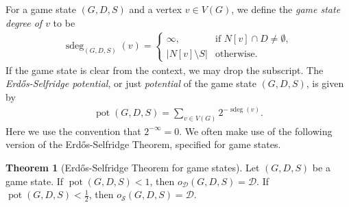 \documentclass[a4paper,11pt,oneside]{scrartcl}
\theoremstyle{definition}
\newtheorem{theorem}[definition]{Theorem}
\theoremstyle{remark}
\DeclareMathOperator{\pot}{pot}
\DeclareMathOperator{\gsdeg}{sdeg}
\begin{document}
For a game state $(G,D,S)$ and a vertex $v \in V(G)$, we define the \emph{game state degree of $v$} to be
\begin{align*}
    \gsdeg_{(G,D,S)}(v) = \begin{cases}
        \infty, &\text{if } N[v] \cap D \neq \emptyset,\\
        \left|N[v] \setminus S\right| &\text{otherwise}.
    \end{cases}
\end{align*}
If the game state is clear from the context, we may drop the subscript. The \emph{Erd\H{o}s-Selfridge potential}, or just \emph{potential} of the game state $(G,D,S)$, is given by
\begin{align*}
    \pot(G,D,S) = \sum_{v \in V(G)} 2^{-\gsdeg(v)}.
\end{align*}
Here we use the convention that $2^{-\infty} = 0$. We often make use of the following version of the Erd\H{o}s-Selfridge Theorem, specified for game states.
\begin{theorem}[Erd\H{o}s-Selfridge Theorem for game states]\label{theorem:ES_for_gs}
    Let $(G,D,S)$ be a game state. If $\pot(G,D,S) < 1$, then $o_{\mathcal D}(G,D,S) = \mathcal D$. If $\pot(G,D,S) < \frac 12$, then $o_{\mathcal S}(G,D,S) = \mathcal D$. 
\end{theorem}
\end{document}

